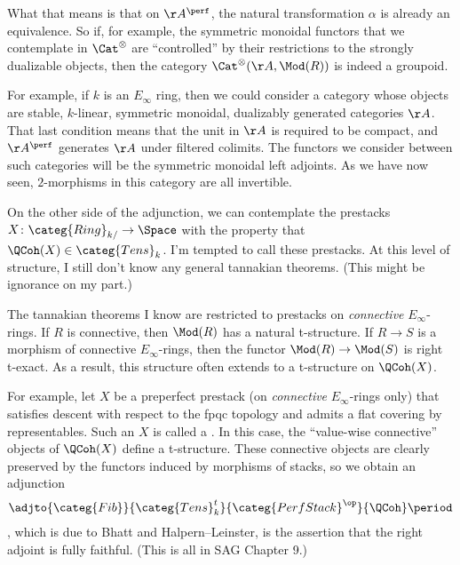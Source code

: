 \documentclass[leqno]{article}
\begin{document}
What that means is that on \(\AA^{\perf}\),
the natural transformation \(\alpha\) is already an equivalence.
So if, for example, the symmetric monoidal functors
that we contemplate in \(\Cat^{\otimes}\) are
\enquote{controlled} by their restrictions
to the strongly dualizable objects, then the category
\(\Cat^{\otimes}(\AA,\Mod(R))\) is indeed a groupoid.

For example, if \(k\) is an \(E_{\infty}\) ring,
then we could consider a category whose objects are
stable, \(k\)-linear, symmetric monoidal,
dualizably generated categories \(\AA\).
That last condition means that
the unit in \(\AA\) is required to be compact, and
\(\AA^{\perf}\) generates \(\AA\) under filtered colimits.
The functors we consider between such categories will be
the symmetric monoidal left adjoints.
As we have now seen,
\(2\)-morphisms in this category are all invertible.

On the other side of the adjunction,
we can contemplate the prestacks
\(X \colon \categ{Ring}_{k/} \to \Space\)
with the property that \(\QCoh(X) \in \categ{Tens}_k\).
I'm tempted to call these  prestacks.
At this level of structure,
I still don't know any general tannakian theorems.
(This might be ignorance on my part.)

The tannakian theorems I know are restricted
to prestacks on \emph{connective} \(E_{\infty}\)-rings.
If \(R\) is connective, then \(\Mod(R)\) has a natural t-structure.
If \(R \to S\) is a morphism of connective \(E_{\infty}\)-rings,
then the functor \(\Mod(R) \to \Mod(S)\) is right t-exact.
As a result, this structure often extends
to a t-structure on \(\QCoh(X)\).

For example, let \(X\) be a preperfect prestack
(on \emph{connective} \(E_{\infty}\)-rings only)
that satisfies descent with respect to the fpqc topology and
admits a flat covering by representables.
Such an \(X\) is called a .
In this case, the \enquote{value-wise connective} objects
of \(\QCoh(X)\) define a t-structure.
These connective objects are clearly preserved by the functors
induced by morphisms of stacks, so we obtain an adjunction
\begin{equation*}
    \adjto{\categ{Fib}}{\categ{Tens}^{t}_k}
    {\categ{PerfStack}^{\op}}{\QCoh} \period
\end{equation*}
,
which is due to Bhatt and Halpern--Leinster,
is the assertion that the right adjoint is fully faithful.
(This is all in SAG Chapter 9.)
\end{document}
